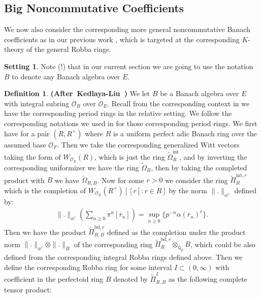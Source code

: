 \documentclass[12pt]{amsart}
\theoremstyle{definition}
\newtheorem{definition}[theorem]{Definition}
\numberwithin{equation}{section}
\newtheorem{setting}[theorem]{Setting}
\begin{document}
\subsection{Big Noncommutative Coefficients}

\noindent We now also consider the corresponding more general noncommutative Banach coefficients as in our previous work \cite{T2}, which is targeted at the corresponding $K$-theory of the general Robba rings.


\begin{setting}
Note (!) that in our current section we are going to use the notation $B$ to denote any Banach algebra over $E$.
\end{setting}


\begin{definition} \mbox{\bf{(After Kedlaya-Liu \cite[Definition 4.1.1]{KL2})}}
We let $B$ be a Banach algebra over $E$ with integral subring $\mathcal{O}_B$ over $\mathcal{O}_E$. Recall from the corresponding context in \cite{KL1} we have the corresponding period rings in the relative setting. We follow the corresponding notations we used in \cite[Section 2.1]{T2} for those corresponding period rings. We first have for a pair $(R,R^+)$ where $R$ is a uniform perfect adic Banach ring over the assumed base $\mathcal{O}_F$. Then we take the corresponding generalized Witt vectors taking the form of $W_{\mathcal{O}_E}(R)$, which is just the ring $\widetilde{\Omega}_R^\mathrm{int}$, and by inverting the corresponding uniformizer we have the ring $\widetilde{\Omega}_R$, then by taking the completed product with $B$ we have $\widetilde{\Omega}_{R,B}$. Now for some $r>0$ we consider the ring $\widetilde{\Pi}^{\mathrm{int},r}_{R}$ which is the completion of $W_{\mathcal{O}_E}(R^+)[[r]:r\in R] $ by the norm $\|.\|_{\alpha^r}$ defined by:
\begin{align}
\|.\|_{\alpha^r}(\sum_{n\geq 0}\pi^n[\overline{r}_n])=\sup_{n\geq 0}\{p^{-n}\alpha(\overline{r}_n)^r\}.	
\end{align}
Then we have the product $\widetilde{\Pi}^{\mathrm{bd},r}_{R,B}$ defined as the completion under the product norm $\|.\|_{\alpha^r}\otimes \|.\|_B$ of the corresponding ring $\widetilde{\Pi}^{\mathrm{bd},r}_{R}\otimes_{\mathbb{Q}_p}B$, which could be also defined from the corresponding integral Robba rings defined above. Then we define the corresponding Robba ring for some interval $I\subset (0,\infty)$ with coefficient in the perfectoid ring $B$ denoted by $\widetilde{\Pi}^{I}_{R,B}$ as the following complete tensor product:
\begin{displaymath}

\end{displaymath}
\end{definition}
\end{document}

